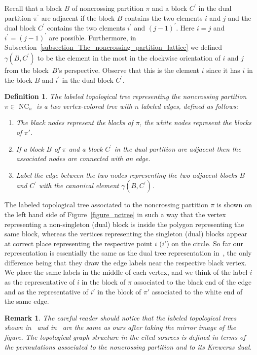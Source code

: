 \documentclass[11pt]{amsart}
\newtheorem{definition}[theorem]{Definition}
\newtheorem{remark}[theorem]{Remark}
\numberwithin{equation}{section}
\DeclareMathOperator{\NC}{NC}
\begin{document}
Recall that a block $B$ of noncrossing
partition $\pi$ and a block $C^{\prime}$ in the dual partition $\pi^{\prime}$
are adjacent if the block $B$ contains the two elements $i$ and $j$
and the dual block $C^{\prime}$ contains the two elements $i^{\prime}$
and $(j-1)^{\prime}$.
Here $i=j$ and $i^{\prime}=(j-1)^{\prime}$ are possible.
Furthermore,
in Subsection~\ref{subsection_The_noncrossing_partition_lattice}
we defined
$\gamma(B,C^{\prime})$
to be the element in
the most in the clockwise orientation of $i$ and $j$ from the block~$B$'s
perspective.
Observe that this is the element $i$
since it has $i$ in the block $B$ and
$i^{\prime}$ in the dual block $C^{\prime}$.


\begin{definition}
\label{definition_toptree}
The {\em labeled topological tree representing the noncrossing partition
$\pi\in\NC_{n}$} is a two vertex-colored tree with $n$ labeled
edges, defined as follows:
\begin{enumerate}  
\item
The black nodes represent the blocks of $\pi$, the white
nodes represent the blocks of $\pi'$.
\item
If a block $B$ of $\pi$ and a block $C^{\prime}$ in the dual partition
are adjacent then the associated nodes are connected with an edge.
\item
Label the edge between the two nodes representing the two adjacent blocks
$B$ and $C^{\prime}$
with the canonical element $\gamma(B,C^{\prime})$.
\end{enumerate}  
\end{definition}    
The labeled topological tree associated to the noncrossing partition $\pi$ is
shown on the left hand side of Figure~\ref{figure_nctree} in such a way
that the vertex representing a non-singleton (dual) block is inside the polygon
representing the same block, whereas the vertices representing the
singleton (dual) blocks appear at correct place representing the
respective point $i$ ($i'$) on the circle. So far our representation is
essentially the same as the dual tree representation
in~\cite[Section~2]{Kortchemski_Marzouk}, the only difference being that they draw the
edge labels near the respective black vertex. 
We place the same labels in the middle of each vertex, and we think of the
label $i$ as the representative of $i$ in the block of $\pi$ associated
to the black end of the edge and as the representative of $i'$ in the
block of $\pi'$ associated to the white end of the same edge.
\begin{remark}
{\rm The careful reader should notice that the labeled topological trees
  shown in~\cite[Figure~2]{Kortchemski_Marzouk} and
  in~\cite[Figure~3]{Muhle_Nadeau_Williams} are the
  same as ours after taking the mirror image of the figure. The topological
  graph structure in the cited sources is defined in terms of the permutations
  associated to the noncrossing partition and to its Kreweras dual.  
}    
\end{remark}  
\end{document}
